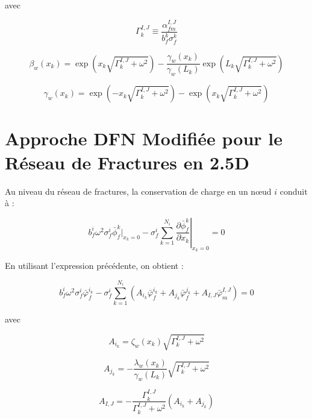 avec

\begin{equation}
\Gamma_k^{I,J}\equiv \frac{\alpha_{fm}^{I,J}}{b_f^k\sigma_f^k}
\end{equation}

\begin{equation}
\beta_w(x_k)=\exp\left(x_k\sqrt{\Gamma_k^{I,J}+\omega^2}\right)-\frac{\gamma_w(x_k)}{\gamma_w(L_k)}\exp\left(L_k\sqrt{\Gamma_k^{I,J}+\omega^2}\right)
\end{equation}

\begin{equation}
\gamma_w(x_k)=\exp\left(-x_k\sqrt{\Gamma_k^{I,J}+\omega^2}\right)-\exp\left(x_k\sqrt{\Gamma_k^{I,J}+\omega^2}\right)
\end{equation}

\section{Approche DFN Modifiée pour le Réseau de Fractures en 2.5D}

Au niveau du réseau de fractures, la conservation de charge en un nœud $i$ conduit à :

\begin{equation}
b_f^i\omega^2\sigma_f^i\bar{\phi}_f^k\big|_{x_k=0}-\sigma_f^i\sum_{k=1}^{N_i}\left.\frac{\partial \bar{\phi}_f^k}{\partial x_k}\right|_{x_k=0}=0
\end{equation}

En utilisant l'expression précédente, on obtient :

\begin{equation}
b_f^i\omega^2\sigma_f^i\bar{\varphi}_f^{i_k}-\sigma_f^i\sum_{k=1}^{N_i}\left(A_{i_k}\bar{\varphi}_f^{i_k}+A_{j_k}\bar{\varphi}_f^{j_k}+A_{I,J}\bar{\varphi}_m^{I,J}\right)=0
\end{equation}

avec

\begin{equation}
A_{i_k}=\zeta_w(x_k)\sqrt{\Gamma_k^{I,J}+\omega^2}
\end{equation}

\begin{equation}
A_{j_k}=-\frac{\lambda_w(x_k)}{\gamma_w(L_k)}\sqrt{\Gamma_k^{I,J}+\omega^2}
\end{equation}

\begin{equation}
A_{I,J}=-\frac{\Gamma_k^{I,J}}{\Gamma_k^{I,J}+\omega^2}\left(A_{i_k}+A_{j_k}\right)
\end{equation}


